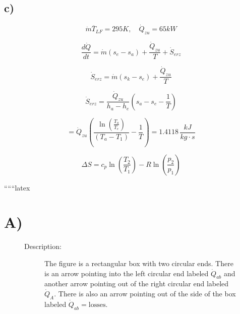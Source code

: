 

\subsection*{c)}

\[
\dot{m} \overline{T}_{LF} = 295K, \quad \dot{Q}_{zu} = 65kW
\]

\[
\frac{d\dot{Q}}{dt} = \dot{m} (s_e - s_a) + \frac{\dot{Q}_{zu}}{T} + \dot{S}_{erz}
\]

\[
\dot{S}_{erz} = \dot{m} (s_{k} - s_{e}) + \frac{\dot{Q}_{zu}}{T}
\]

\[
\dot{S}_{erz} = \frac{\dot{Q}_{zu}}{h_a - h_e} \left( s_{a} - s_{e} - \frac{1}{T} \right)
\]

\[
= \dot{Q}_{zu} \left( \frac{\ln \left( \frac{T_a}{T_e} \right)}{(T_a - T_1)} - \frac{1}{T} \right) = 1.4118 \, \frac{kJ}{kg \cdot s}
\]

\[
\Delta S = c_p \ln \left( \frac{T_2}{T_1} \right) - R \ln \left( \frac{p_2}{p_1} \right)
\]

``````latex


\section*{A)}

\begin{figure}[h!]
\centering
\begin{minipage}{0.5\textwidth}
\centering
\begin{description}
\item[Description:] The figure is a rectangular box with two circular ends. There is an arrow pointing into the left circular end labeled $\dot{Q}_{ab}$ and another arrow pointing out of the right circular end labeled $\dot{Q}_A$. There is also an arrow pointing out of the side of the box labeled $\dot{Q}_{ab} = \text{losses}$.
\end{description}
\end{minipage}
\end{figure}


